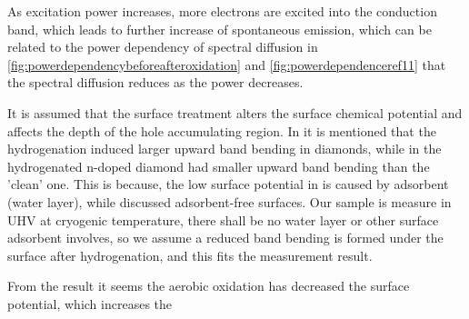 As excitation power increases, more electrons are excited into the conduction band, which leads to further increase of spontaneous emission, which can be related to the power dependency of spectral diffusion in \ref{fig:powerdependencybeforeafteroxidation} and  \ref{fig:powerdependenceref11} that the spectral diffusion reduces as the power decreases.

It is assumed that the surface treatment alters the surface chemical potential and affects the depth of  the hole accumulating region. In \citep{stacey_depletion_2012} it is mentioned that the hydrogenation induced larger upward band bending in diamonds, while in \citep{diederich_electron_1998} the hydrogenated n-doped diamond had smaller upward band bending than the 'clean' one. This is because, the low surface potential in \citep{stacey_depletion_2012} is caused by adsorbent (water layer), while \citep{diederich_electron_1998} discussed adsorbent-free surfaces. Our sample is measure in UHV at cryogenic temperature, there shall be no water layer or other surface adsorbent involves, so we assume a reduced band bending is formed under the surface after hydrogenation, and this fits the measurement result.

From the result it seems the aerobic oxidation has decreased the surface potential, which increases the 


